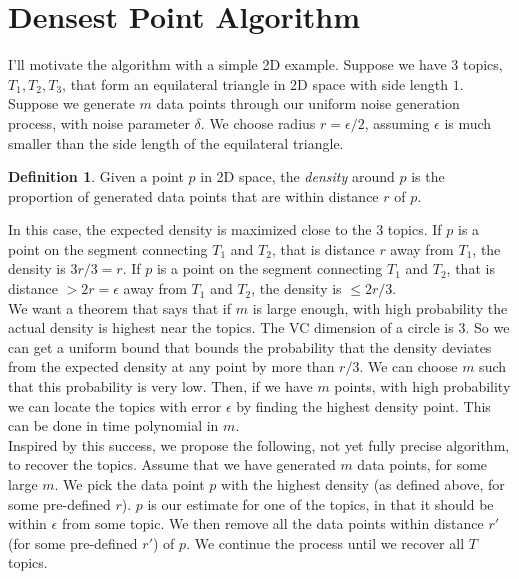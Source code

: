 \documentclass[12pt]{article}
\theoremstyle{definition}
\newtheorem{definition}{Definition}[section]
\begin{document}
\section{Densest Point Algorithm}

I'll motivate the algorithm with a simple 2D example. Suppose we have 3 topics, $T_1, T_2, T_3$, that form an equilateral triangle in 2D space with side length $1$. Suppose we generate $m$ data points through our uniform noise generation process, with noise parameter $\delta$. We choose radius $r = \epsilon/2$, assuming $\epsilon$ is much smaller than the side length of the equilateral triangle.

\begin{definition}
Given a point $p$ in 2D space, the \emph{density} around $p$ is the proportion of generated data points that are within distance $r$ of $p$.
\end{definition}

In this case, the expected density is maximized close to the 3 topics. If $p$ is a point on the segment connecting $T_1$ and $T_2$, that is distance $r$ away from $T_1$, the density is $3r/3 = r$. If $p$ is a point on the segment connecting $T_1$ and $T_2$, that is distance $> 2r = \epsilon$ away from $T_1$ and $T_2$, the density is $\leq 2r/3$.
\\

We want a theorem that says that if $m$ is large enough, with high probability the actual density is highest near the topics. The VC dimension of a circle is 3. So we can get a uniform bound that bounds the probability that the density deviates from the expected density at any point by more than $r/3$. We can choose $m$ such that this probability is very low. Then, if we have $m$ points, with high probability we can locate the topics with error $\epsilon$ by finding the highest density point. This can be done in time polynomial in $m$.
\\

Inspired by this success, we propose the following, not yet fully precise algorithm, to recover the topics. Assume that we have generated $m$ data points, for some large $m$. We pick the data point $p$ with the highest density (as defined above, for some pre-defined $r$). $p$ is our estimate for one of the topics, in that it should be within $\epsilon$ from some topic. We then remove all the data points within distance $r'$ (for some pre-defined $r'$) of $p$. We continue the process until we recover all $T$ topics.
\\
\end{document}
